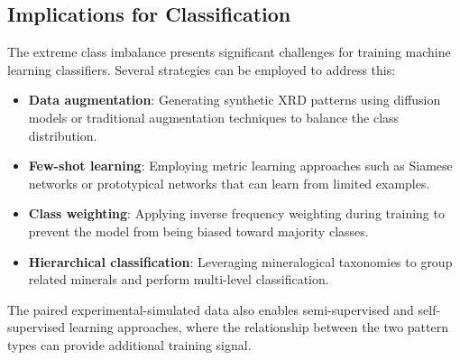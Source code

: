 \subsection{Implications for Classification}

The extreme class imbalance presents significant challenges for training machine learning classifiers. Several strategies can be employed to address this:

\begin{itemize}
    \item \textbf{Data augmentation}: Generating synthetic XRD patterns using diffusion models or traditional augmentation techniques to balance the class distribution.
    \item \textbf{Few-shot learning}: Employing metric learning approaches such as Siamese networks or prototypical networks that can learn from limited examples.
    \item \textbf{Class weighting}: Applying inverse frequency weighting during training to prevent the model from being biased toward majority classes.
    \item \textbf{Hierarchical classification}: Leveraging mineralogical taxonomies to group related minerals and perform multi-level classification.
\end{itemize}

The paired experimental-simulated data also enables semi-supervised and self-supervised learning approaches, where the relationship between the two pattern types can provide additional training signal.

